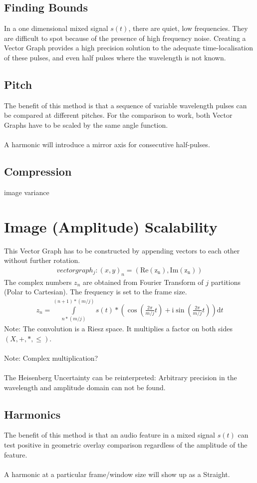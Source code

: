 \documentclass{report}
\begin{document}
\subsection{Finding Bounds}
In a one dimensional mixed signal $s(t)$, there are quiet, low frequencies. They are difficult to spot because of the presence of high frequency noise. Creating a Vector Graph provides a high precision solution to the adequate time-localisation of these pulses, and even half pulses where the wavelength is not known.
\subsection{Pitch}
The benefit of this method is that a sequence of variable wavelength pulses can be compared at different pitches. For the comparison to work, both Vector Graphs have to be scaled by the same angle function.\\\\
A harmonic will introduce a mirror axis for consecutive half-pulses.
\subsection{Compression}
image variance
\section{Image (Amplitude) Scalability}
This Vector Graph has to be constructed by appending vectors to each other without further rotation.
\begin{align}
vectorgraph_{j}: (x,y)_{n}=(\mathrm{Re(z_{n})},\mathrm{Im(z_{n})})
\end{align}
The complex numbers $z_{n}$ are obtained from Fourier Transform of $j$ partitions (Polar to Cartesian). The frequency is set to the frame size.
\begin{align}
z_{n}= \int \limits _{n*(m/j)}^{(n+1)*(m/j)} s(t)*(\cos(\frac{2\pi}{m/j}t)+\mathrm{i}\sin(\frac{2\pi}{m/j}t))\mathrm{d}t
\end{align}
Note: The convolution is a Riesz space. It multiplies a factor on both sides $(X,+,*,\leq)$.\\\\
Note: Complex multiplication?\\\\
The Heisenberg Uncertainty can be reinterpreted: Arbitrary precision in the wavelength and amplitude domain can not be found.
\subsection{Harmonics}
The benefit of this method is that an audio feature in a mixed signal $s(t)$ can test positive in geometric overlay comparison regardless of the amplitude of the feature.\\\\
A harmonic at a particular frame/window size will show up as a Straight.
\end{document}
